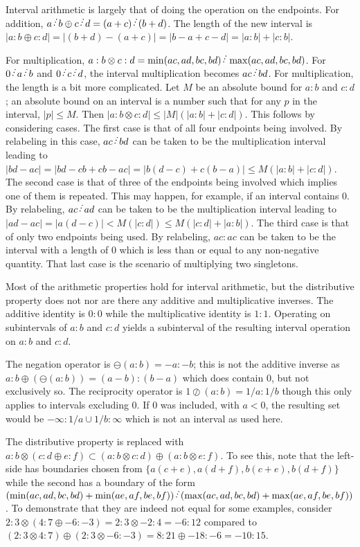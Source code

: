 \documentclass[12pt]{article}
\begin{document}
Interval arithmetic is largely that of doing the operation on the endpoints. For addition, $a \lte b \oplus c \lte d = (a+c) \lte (b+d)$. The length of the new interval is $|a:b \oplus c:d| = |(b+d) - (a + c)| = |b-a+ c-d| = |a:b|+|c:b|$.

For multiplication, $a:b \otimes c:d = \min(ac, ad, bc, bd)\lte \max(ac, ad, bc, bd)$. For $0 \lte a \lte b$ and $0 \lte c \lte d$, the interval multiplication becomes $ac \lte bd$. For multiplication, the length is a bit more complicated. Let $M$ be an absolute bound for $a:b$ and $c:d$; an absolute bound on an interval is a number such that for any $p$ in the interval, $|p| \leq M$. Then $|a:b \otimes c:d| \leq |M|(|a:b| + |c:d|)$. This follows by considering cases. The first case is that of all four endpoints being involved. By relabeling in this case,  $ac \lte bd$ can be taken to be the multiplication interval leading to $|bd - ac| = |bd - cb + cb - ac| = |b(d-c) + c (b-a)| \leq M (|a:b| + |c:d|)$. The second case is that of three of the endpoints being involved which implies one of them is repeated. This may happen, for example, if an interval contains 0. By relabeling, $ac \lte ad$ can be taken to be the multiplication interval leading to $|ad - ac| = |a(d-c)| < M (|c:d|) \leq M (|c:d| + |a:b|)$. The third case is that of only two endpoints being used. By relabeling, $ac:ac$ can be taken to be the interval with a length of 0 which is less than or equal to any non-negative quantity.  That last case is the scenario of multiplying two singletons. 

Most of the arithmetic properties hold for interval arithmetic, but the distributive property does not nor are there any additive and multiplicative inverses. The additive identity is $0:0$ while the multiplicative identity is $1:1$. Operating on subintervals of $a:b$ and $c:d$ yields a subinterval of the resulting interval operation on $a:b$ and $c:d$. 

The negation operator is $\ominus(a:b) = -a:-b$; this is not the additive inverse as $a:b \oplus (\ominus(a :b )) = (a-b):(b-a)$ which does contain 0, but not exclusively so. The reciprocity operator is $1 \oslash (a:b) = 1/a : 1/b$ though this only applies to intervals excluding 0. If 0 was included, with $a < 0$, the resulting set would be $-\infty:1/a \cup 1/b : \infty $ which is not an interval as used here.

The distributive property is replaced with $ a:b \otimes ( c:d \oplus e:f) \subset (a:b \otimes c:d) \oplus (a:b \otimes e:f)$. To see this, note that the left-side has boundaries chosen from $\{a(c+e), a(d+f), b(c+e), b(d+f)\}$ while the second has a boundary of the form $(\min(ac, ad, bc, bd) + \min(ae, af, be, bf) ) \lte (\max(ac, ad, bc, bd) + \max(ae, af, be, bf) )$. To demonstrate that they are indeed not equal for some examples, consider $2:3 \otimes ( 4:7 \oplus -6:-3) = 2:3 \otimes -2:4 = -6:12$ compared to $(2:3 \otimes 4:7) \oplus (2:3 \otimes -6:-3) = 8:21 \oplus -18:-6 = -10:15$. 
\end{document}
